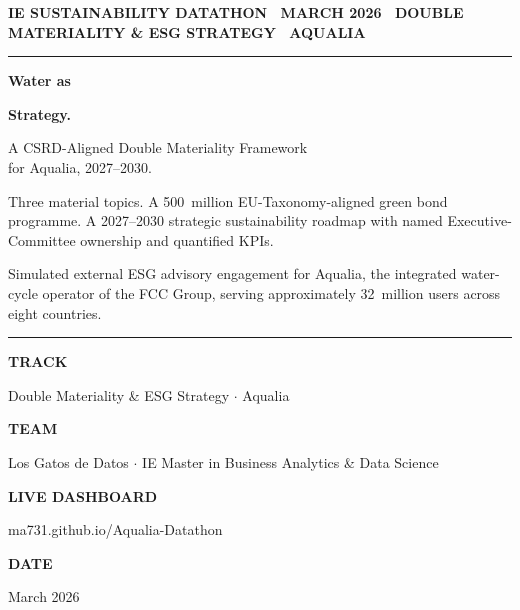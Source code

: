 \documentclass[11pt, a4paper]{article}
\newcommand{\euro}{\texteuro}
\begin{document}
\pagestyle{empty}

\begin{titlepage}
\vspace*{1.0cm}

{\sffamily\color{aqua}\bfseries\footnotesize IE SUSTAINABILITY DATATHON \textbullet\ MARCH 2026 \textbullet\ DOUBLE MATERIALITY \& ESG STRATEGY \textbullet\ AQUALIA}

\vspace{0.3cm}
{\color{aqua}\rule{\textwidth}{1.2pt}}
\vspace{2.4cm}

{\fontsize{44pt}{48pt}\selectfont\sffamily\bfseries\color{navy} Water as}\par
\vspace{0.15cm}
{\fontsize{44pt}{48pt}\selectfont\sffamily\bfseries\color{aqua} Strategy.}\par

\vspace{1.2cm}
{\Large\sffamily\color{deep} A CSRD-Aligned Double Materiality Framework\\[2pt] for Aqualia, 2027--2030.}\par

\vspace{2.5cm}
{\normalsize\color{ink}
Three material topics. A \euro{}500~million EU-Taxonomy-aligned green bond programme.
A 2027--2030 strategic sustainability roadmap with named Executive-Committee ownership and
quantified KPIs.\par
\vspace{0.45cm}
Simulated external ESG advisory engagement for Aqualia, the integrated water-cycle operator
of the FCC Group, serving approximately 32~million users across eight countries.
\par}

\vfill

{\color{navy}\rule{\textwidth}{0.6pt}}
\vspace{0.35cm}

\sffamily\small
\newcommand{\covlbl}[1]{\parbox[t]{3.2cm}{\color{aqua}\footnotesize\bfseries #1}}
\newcommand{\covval}[1]{\parbox[t]{12cm}{\color{ink}#1}}

\covlbl{TRACK}\covval{Double Materiality \& ESG Strategy $\cdot$ Aqualia}\par\smallskip
\covlbl{TEAM}\covval{Los Gatos de Datos $\cdot$ IE Master in Business Analytics \& Data Science}\par\smallskip
\covlbl{LIVE DASHBOARD}\covval{\ttfamily ma731.github.io/Aqualia-Datathon}\par\smallskip
\covlbl{DATE}\covval{March 2026}\par
\rmfamily
\end{titlepage}
\end{document}
